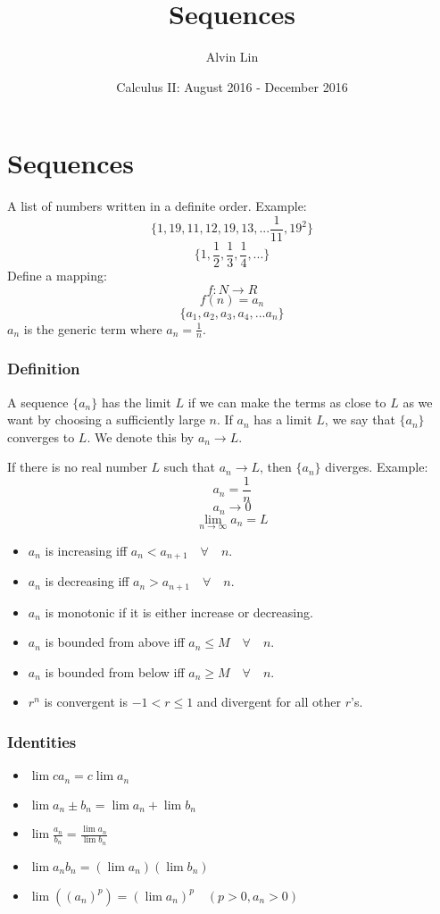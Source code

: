\documentclass[letterpaper, 12pt]{math}
\title{Sequences}
\author{Alvin Lin}
\date{Calculus II: August 2016 - December 2016}
\begin{document}
\maketitle

\section*{Sequences}
A list of numbers written in a definite order. Example:
\[ \bigg\{1,19,11,12,19,13,...\frac{1}{11},19^{2}\bigg\} \]
\[ \bigg\{1,\frac{1}{2},\frac{1}{3},\frac{1}{4},...\bigg\} \]
Define a mapping:
\[ f:N \rightarrow R \]
\[ f(n) = a_{n} \]
\[ \bigg\{a_{1},a_{2},a_{3},a_{4},...a_{n}\bigg\} \]
\( a_{n} \) is the generic term where \( a_{n} = \frac{1}{n} \).

\subsubsection*{Definition}
A sequence \( \{a_{n}\} \) has the limit \( L \) if we can make the terms
as close to \( L \) as we want by choosing a sufficiently large \( n \). If
\( a_{n} \) has a limit \( L \), we say that \( \{a_{n}\} \) converges to
\( L \). We denote this by \( a_{n} \rightarrow L \). \par
If there is no real number \( L \) such that \( a_{n} \rightarrow L \),
then \( \{a_{n}\} \) diverges.
\newline
Example:
\[ a_{n} = \frac{1}{n} \]
\[ a_{n} \to 0 \]
\[ \lim_{n \to \infty}{a_{n}} = L \]
\begin{itemize}
  \item \( a_{n} \) is increasing iff
    \( a_{n}<a_{n+1} \quad \forall \quad n \).
  \item \( a_{n} \) is decreasing iff
    \( a_{n}>a_{n+1} \quad \forall \quad n \).
  \item \( a_{n} \) is monotonic if it is either increase or decreasing.
  \item \( a_{n} \) is bounded from above iff
    \( a_{n} \leq M \quad \forall \quad n \).
  \item \( a_{n} \) is bounded from below iff
    \( a_{n} \geq M \quad \forall \quad n \).
  \item \( r^{n} \) is convergent is \( -1 < r \leq 1 \) and divergent
    for all other \( r \)'s.
\end{itemize}

\subsubsection*{Identities}
\begin{itemize}
  \item \( \lim{ca_{n}} = c\lim{a_{n}} \)
  \item \( \lim{a_{n} \pm b_{n}} = \lim{a_{n}}+\lim{b_{n}} \)
  \item \( \lim{\frac{a_{n}}{b_{n}}} = \frac{\lim{a_{n}}}{\lim{b_{n}}} \)
  \item \( \lim{a_{n}b_{n}} = (\lim{a_{n}})(\lim{b_{n}}) \)
  \item \( \lim{((a_{n})^{p})} = (\lim{a_{n}})^{p} \quad (p>0,a_{n}>0) \)
\end{itemize}
\end{document}
